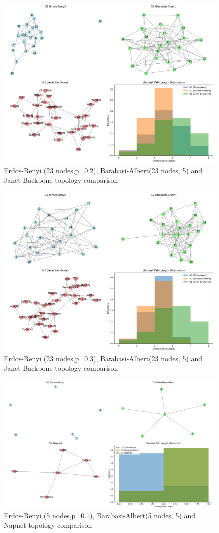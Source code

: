 \begin{figure}
    \centering
    \includegraphics[width=0.7\linewidth]{images/final-topo-comparison/2_1.png}
    \caption{Erdos-Renyi (23 nodes,p=0.2), Barabasi-Albert(23 nodes, 5) and Janet-Backbone topology comparison}
    \label{fig:2_1_comparison}
\end{figure}

\begin{figure}
    \centering
    \includegraphics[width=0.7\linewidth]{images/final-topo-comparison/3_1.png}
    \caption{Erdos-Renyi (23 nodes,p=0.3), Barabasi-Albert(23 nodes, 5) and Janet-Backbone topology comparison}
    \label{fig:3_1_comparison}
\end{figure}

\newpage

\begin{figure}
    \centering
    \includegraphics[width=0.7\linewidth]{images/final-topo-comparison/napnet/1_1.png}
    \caption{Erdos-Renyi (5 nodes,p=0.1), Barabasi-Albert(5 nodes, 5) and Napnet topology comparison}
    \label{fig:napnet_1}
\end{figure}

